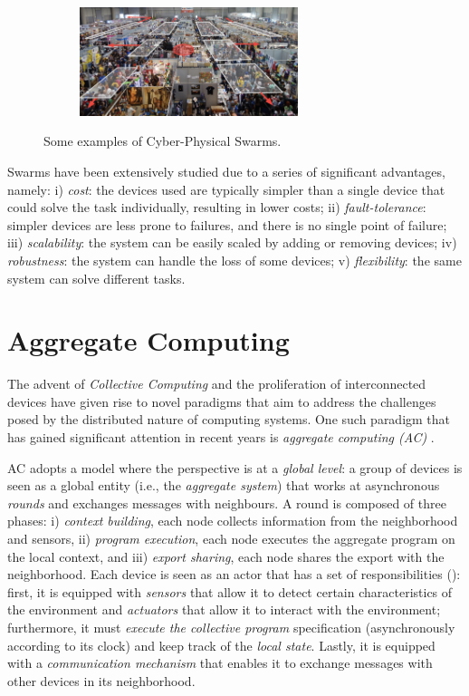 \documentclass[12pt,a4paper,openright,twoside]{book}
\begin{document}
\begin{figure}[t]
\begin{subfigure}[b]{0.49\textwidth}
        \centering
        \includegraphics[width=0.7\textwidth]{figures/crowd.png}
    \end{subfigure}
    \caption{Some examples of Cyber-Physical Swarms.}%
    \label{fig:cpsw}
\end{figure}


Swarms have been extensively studied due to a series of significant advantages, namely:
    i) \emph{cost}: the devices used are typically simpler than a single device that could solve the task individually, resulting in lower costs;
    ii) \emph{fault-tolerance}: simpler devices are less prone to failures, and there is no single point of failure;
    iii) \emph{scalability}: the system can be easily scaled by adding or removing devices;
    iv) \emph{robustness}: the system can handle the loss of some devices;
    v) \emph{flexibility}: the same system can solve different tasks.


%
\section{Aggregate Computing}

The advent of \emph{Collective Computing} and the proliferation of interconnected devices have given rise to novel 
    paradigms that aim to address the challenges posed by the distributed nature of computing
    systems. One such paradigm that has gained significant attention in recent years is 
    \emph{aggregate computing (AC)} \cite{AC}.

AC adopts a model where the perspective is at a \emph{global level}: 
    a group of devices is seen as a global entity (i.e., the \emph{aggregate system}) that works at asynchronous 
    \emph{rounds} and exchanges messages with neighbours. 
    A round is composed of three phases:
    i) \emph{context building}, each node collects information from the 
        neighborhood and sensors,
    ii) \emph{program execution}, each node executes the aggregate program on the local context, and
    iii) \emph{export sharing}, each node shares the export with the neighborhood.
    Each device is seen as an actor that has a set of responsibilities (): first, it is equipped with 
    \emph{sensors} that allow it to detect certain characteristics of the environment and \emph{actuators} that allow 
    it to interact with the environment; furthermore, it must \emph{execute the collective program} specification 
    (asynchronously according to its clock) and keep track of the \emph{local state}. Lastly, it is equipped with 
    a \emph{communication mechanism} that enables it to exchange messages with other devices in its neighborhood.
\end{document}
